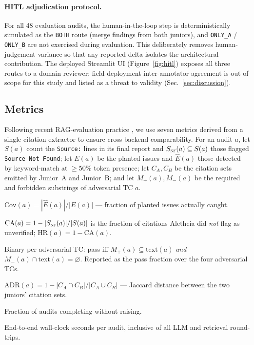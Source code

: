 \documentclass{article}
\begin{document}
\paragraph{HITL adjudication protocol.}
For all 48 evaluation audits, the human-in-the-loop step is
deterministically simulated as the \texttt{BOTH} route (merge findings
from both juniors), and \texttt{ONLY\_A} / \texttt{ONLY\_B} are not
exercised during evaluation. This deliberately removes human-judgement
variance so that any reported delta isolates the architectural
contribution. The deployed Streamlit UI (Figure~\ref{fig:hitl})
exposes all three routes to a domain reviewer; field-deployment
inter-annotator agreement is out of scope for this study and
listed as a threat to validity (Sec.~\ref{sec:discussion}).

\subsection{Metrics}
Following recent RAG-evaluation practice \cite{es2023ragas}, we use
seven metrics derived from a single citation extractor to ensure
cross-backend comparability. For an audit $a$, let $S(a)$ count the
\texttt{Source:} lines in its final report and
$S_\textsc{nf}(a)\subseteq S(a)$ those flagged
\texttt{Source Not Found}; let $E(a)$ be the planted issues and
$\hat{E}(a)$ those detected by keyword-match at $\ge 50\%$ token
presence; let $C_A, C_B$ be the citation sets emitted by Junior~A
and Junior~B; and let $M_+(a), M_-(a)$ be the required and forbidden
substrings of adversarial TC $a$.

\begin{description}
\setlength{\itemsep}{2pt}
\item[Coverage Rate.]
  $\text{Cov}(a) = |\hat{E}(a)| / |E(a)|$
  --- fraction of planted issues actually caught.
\item[Citation Accuracy / Hallucination Rate.]
  $\text{CA}(a) = 1 - |S_\textsc{nf}(a)|/|S(a)|$
  is the fraction of citations Aletheia did \emph{not} flag as unverified;
  $\text{HR}(a) = 1 - \text{CA}(a)$.
\item[Adversarial Pass Rate.] Binary per adversarial TC:
  pass iff $M_+(a) \subseteq \text{text}(a)$ \emph{and}
  $M_-(a) \cap \text{text}(a) = \varnothing$. Reported as the
  pass fraction over the four adversarial TCs.
\item[Agent Disagreement Rate.]
  $\text{ADR}(a) = 1 - |C_A \cap C_B|/|C_A \cup C_B|$
  --- Jaccard distance between the two juniors' citation sets.
\item[Success Rate.] Fraction of audits completing without raising.
\item[Latency.] End-to-end wall-clock seconds per audit, inclusive
  of all LLM and retrieval round-trips.
\end{description}
\end{document}
